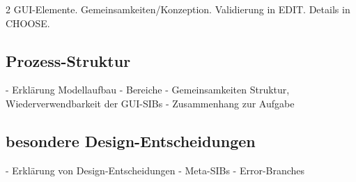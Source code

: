 2 GUI-Elemente. Gemeinsamkeiten/Konzeption. Validierung in EDIT. Details in CHOOSE.

\subsection{Prozess-Struktur}
- Erklärung Modellaufbau 
	- Bereiche
	- Gemeinsamkeiten Struktur, Wiederverwendbarkeit der GUI-SIBs
	- Zusammenhang zur Aufgabe
	
\subsection{besondere Design-Entscheidungen}	
- Erklärung von Design-Entscheidungen
	- Meta-SIBs
	- Error-Branches